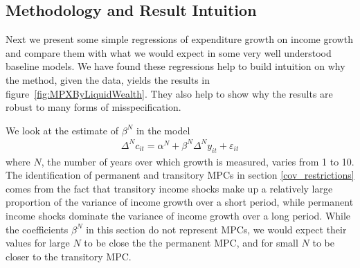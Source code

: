 \documentclass[titlepage]{\econtex}\newcommand{\texname}{ConsumptionHeterogeneity}
\begin{document}
	\subsection{Methodology and Result Intuition} \label{method_intuit}
	Next we present some simple regressions of expenditure growth on income growth and compare them with what we would expect in some very well understood baseline models. We have found these regressions help to build intuition on why the method, given the data, yields the results in figure~\ref{fig:MPXByLiquidWealth}. They also help to show why the results are robust to many forms of misspecification.
	
	We look at the estimate of $\beta^N$ in the model
	\begin{align*}
	\Delta^N c_{it} = \alpha^N + \beta^N \Delta^N y_{it} + \varepsilon_{it}
	\end{align*}
	where $N$, the number of years over which growth is measured, varies from 1 to 10. The identification of permanent and transitory MPCs in section \ref{cov_restrictions} comes from the fact that transitory income shocks make up a relatively large proportion of the variance of income growth over a short period, while permanent income shocks dominate the variance of income growth over a long period. While the coefficients $\beta^N$ in this section do not represent MPCs, we would expect their values for large $N$ to be close the the permanent MPC, and for small $N$ to be closer to the transitory MPC. 
	
\end{document}

